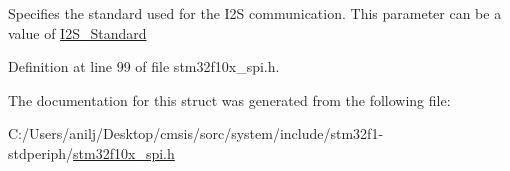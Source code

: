 Specifies the standard used for the I2S communication. This parameter can be a value of \hyperlink{group___i2_s___standard}{I2\+S\+\_\+\+Standard} 

Definition at line 99 of file stm32f10x\+\_\+spi.\+h.



The documentation for this struct was generated from the following file\+:\begin{DoxyCompactItemize}
\item 
C\+:/\+Users/anilj/\+Desktop/cmsis/sorc/system/include/stm32f1-\/stdperiph/\hyperlink{stm32f10x__spi_8h}{stm32f10x\+\_\+spi.\+h}\end{DoxyCompactItemize}
